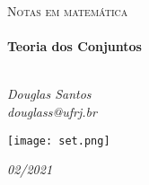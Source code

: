 \begin{titlepage}
   \begin{center}
      \textsc{\Large Notas em matemática}\\[0.5cm]

      \LinhaR \\[0.4cm]
         { \LARGE \bfseries Teoria dos Conjuntos \\[0.4cm]}
      \LinhaR \\[1.4cm]

      \noindent
      \begin{minipage}{0.4\textwidth}
         \begin{center} \large
            \emph{Douglas Santos}\\
            \itshape{douglass@ufrj.br}
         \end{center}
      \end{minipage}

      \begin{center}
         \vspace{100pt}
         \texttt{[image: set.png]}
      \end{center}
      \vfill
      {\large \textit{02/2021}}

   \end{center}
\end{titlepage}
\clearpage